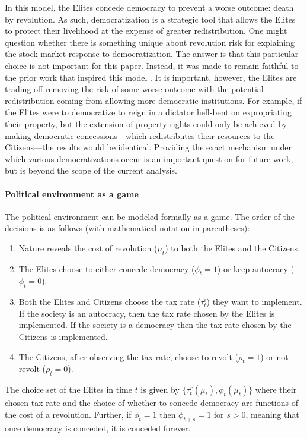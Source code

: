 \documentclass[12pt]{article}
\numberwithin{equation}{section}
\begin{document}
\label{par:hell_bent}
In this model, the Elites concede democracy to prevent a worse outcome: death by revolution. As such, democratization is a strategic tool that allows the Elites to protect their livelihood at the expense of greater redistribution. One might question whether there is something unique about revolution risk for explaining the stock market response to democratization. The answer is that this particular choice is not important for this paper. Instead, it was made to remain faithful to the prior work that inspired this model \citep{Boix2003,Acemoglu2006}. It is important, however, the Elites are trading-off removing the risk of some worse outcome with the potential redistribution coming from allowing more democratic institutions. For example, if the Elites were to democratize to reign in a dictator hell-bent on expropriating their property, but the extension of property rights could only be achieved by making democratic concessions---which redistributes their resources to the Citizens---the results would be identical. Providing the exact mechanism under which various democratizations occur is an important question for future work, but is beyond the scope of the current analysis.

\paragraph{Political environment as a game}
The political environment can be modeled formally as a game. The order of the decisions is as follows (with mathematical notation in parentheses):
\begin{enumerate}
	\item Nature reveals the cost of revolution ($\mu_t$) to both the Elites and the Citizens.
	\item The Elites choose to either concede democracy ($\phi_t = 1$) or keep autocracy ($\phi_t = 0$).
	\item Both the Elites and Citizens choose the tax rate ($\tau_t^{i}$) they want to implement. If the society is an autocracy, then the tax rate chosen by the Elites is implemented. If the society is a democracy then the tax rate chosen by the Citizens is implemented.
	\item The Citizens, after observing the tax rate, choose to revolt ($\rho_t = 1$) or not revolt ($\rho_t = 0$).
\end{enumerate}

The choice set of the Elites in time $t$ is given by $\{\tau_t^r (\mu_t), \phi_t (\mu_t)\}$ where their chosen tax rate and the choice of whether to concede democracy are functions of the cost of a revolution. Further, if $\phi_t = 1$ then $\phi_{t+s} = 1$ for $s>0$, meaning that once democracy is conceded, it is conceded forever. 
\end{document}
